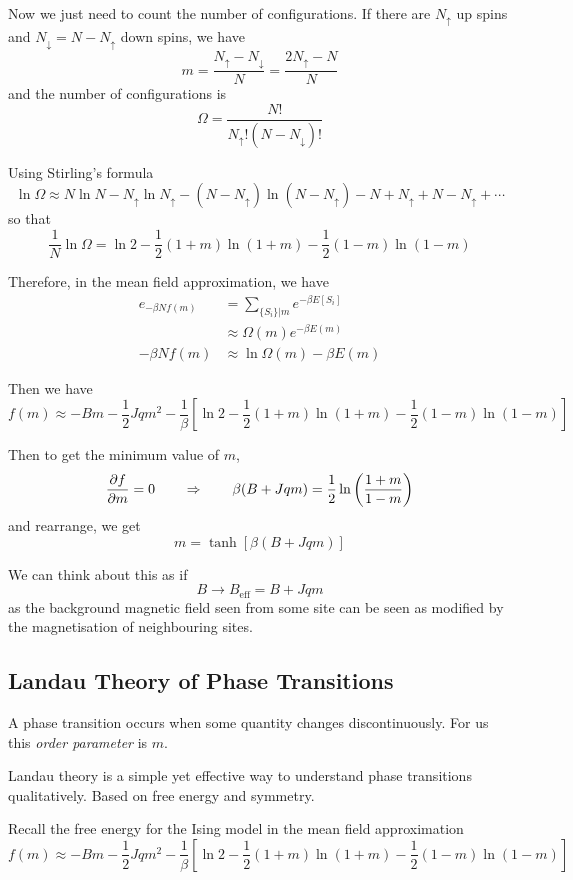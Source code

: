 \documentclass[a4paper,11pt]{article}
\begin{document}
	Now we just need to count the number of configurations. If there are $N_{\uparrow}$ up spins and $N_{\downarrow} = N - N_{\uparrow}$ down spins, we have
	\[
		m = \frac{N_{\uparrow} - N_\downarrow}{N} = \frac{2 N_\uparrow - N}{N}
	\]
	and the number of configurations is
	\[
		\Omega = \frac{N!}{N_\uparrow ! (N - N_\downarrow)!}
	\]
	
	Using Stirling's formula
	\[
		\ln \Omega \approx N \ln N - N_\uparrow \ln N_\uparrow - (N - N_\uparrow) \ln (N - N_\uparrow) - N + N_\uparrow + N - N_\uparrow + \cdots
	\]
	so that
	\[
		\frac{1}{N} \ln \Omega = \ln 2 - \frac{1}{2} (1+m)\ln(1+m) - \frac{1}{2} (1-m)\ln(1-m)
	\]
	
	Therefore, in the mean field approximation, we have
	\begin{align*}
		e_{-\beta N f(m)} & = \sum_{\{S_i\}|m} e^{-\beta E[S_i]}\\
		& \approx \Omega(m) e^{-\beta E(m)}\\
		- \beta N f(m) & \approx \ln \Omega(m) - \beta E(m)
	\end{align*}

	Then we have
	\[
		f(m) \approx - Bm - \frac{1}{2} J q m^2 - \frac{1}{\beta} \left[ \ln 2 - \frac{1}{2} (1+m)\ln(1+m) - \frac{1}{2} (1-m)\ln(1-m) \right]
	\]
	
	Then to get the minimum value of $m$,
	\[
		\pdv{f}{m} = 0 \qquad \Rightarrow\qquad \beta (B + Jqm) = \frac{1}{2} \ln \left( \frac{1+m}{1-m} \right)
	\]
	and rearrange, we get
	\[
		m = \tanh [\beta (B + Jqm)]
	\]
	
	We can think about this as if
	\[
		B \to B_{\text{eff}} = B + J q m
	\]
	as the background magnetic field seen from some site can be seen as modified by the magnetisation of neighbouring sites.
	
	\subsection{Landau Theory of Phase Transitions} 

	A phase transition occurs when some quantity changes discontinuously. For us this \emph{order parameter} is $m$.

	Landau theory is a simple yet effective way to understand phase transitions qualitatively. Based on free energy and symmetry.

	Recall the free energy for the Ising model in the mean field approximation
	\[
		f(m) \approx - B m - \frac{1}{2} J q m^2 - \frac{1}{\beta} \left[ \ln 2 - \frac{1}{2}(1+m)\ln(1+m) - \frac{1}{2} (1-m)\ln(1-m) \right]
	\]
	
\end{document}
